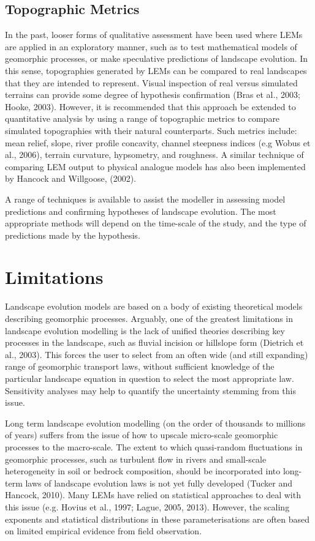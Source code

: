 \subsection{Topographic Metrics}
In the past, looser forms of qualitative assessment have been used where LEMs are applied in an exploratory manner, such as to test mathematical models of geomorphic processes, or make speculative predictions of landscape evolution. In this sense, topographies generated by LEMs can be compared to real landscapes that they are intended to represent. Visual inspection of real versus simulated terrains can provide some degree of hypothesis confirmation (Bras et al., 2003; Hooke, 2003). However, it is recommended that this approach be extended to quantitative analysis by using a range of topographic metrics to compare simulated topographies with their natural counterparts. Such metrics include: mean relief, slope, river profile concavity, channel steepness indices (e.g Wobus et al., 2006), terrain curvature, hypsometry, and roughness. A similar technique of comparing LEM output to physical analogue models has also been implemented by Hancock and Willgoose, (2002). 

A range of techniques is available to assist the modeller in assessing model predictions and confirming hypotheses of landscape evolution. The most appropriate methods will depend on the time-scale of the study, and the type of predictions made by the hypothesis. 

\section{Limitations}

Landscape evolution models are based on a body of existing theoretical models describing geomorphic processes. Arguably, one of the greatest limitations in landscape evolution modelling is the lack of unified theories describing key processes in the landscape, such as fluvial incision or hillslope form (Dietrich et al., 2003). This forces the user to select from an often wide (and still expanding) range of geomorphic transport laws, without sufficient knowledge of the particular landscape equation in question to select the most appropriate law. Sensitivity analyses may help to quantify the uncertainty stemming from this issue.

Long term landscape evolution modelling (on the order of thousands to millions of years) suffers from the issue of how to upscale micro-scale geomorphic processes to the macro-scale. The extent to which quasi-random fluctuations in geomorphic processes, such as turbulent flow in rivers and small-scale heterogeneity in soil or bedrock composition, should be incorporated into long-term laws of landscape evolution laws is not yet fully developed (Tucker and Hancock, 2010). Many LEMs have relied on statistical approaches to deal with this issue (e.g. Hovius et al., 1997; Lague, 2005, 2013). However, the scaling exponents and statistical distributions in these parameterisations are often based on limited empirical evidence from field observation.

